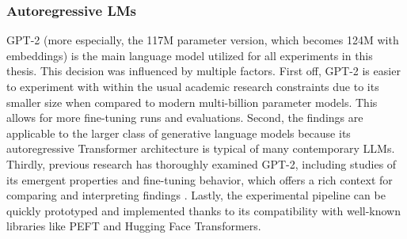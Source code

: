 \documentclass{DESSThesis}
\begin{document}
\subsubsection{Autoregressive LMs}
GPT-2 (more especially, the 117M parameter version, which becomes 124M with embeddings) is the main language model utilized for all experiments in this thesis. This decision was influenced by multiple factors. First off, GPT-2 is easier to experiment with within the usual academic research constraints due to its smaller size when compared to modern multi-billion parameter models. This allows for more fine-tuning runs and evaluations. Second, the findings are applicable to the larger class of generative language models because its autoregressive Transformer architecture is typical of many contemporary LLMs. Thirdly, previous research has thoroughly examined GPT-2, including studies of its emergent properties and fine-tuning behavior, which offers a rich context for comparing and interpreting findings \cite{caron_manipulating_2023,jiang_evaluating_2023}. Lastly, the experimental pipeline can be quickly prototyped and implemented thanks to its compatibility with well-known libraries like PEFT and Hugging Face Transformers.
\end{document}
